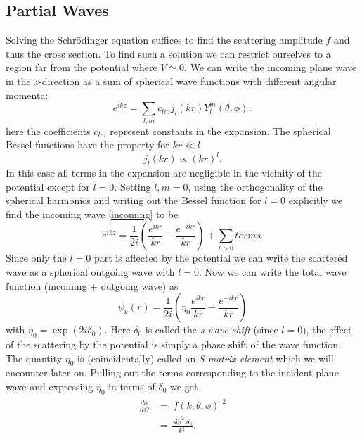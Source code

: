 \documentclass[11pt]{article}
\numberwithin{equation}{section}
\begin{document}
\subsection{Partial Waves}
Solving the Schr\"odinger equation suffices to find the scattering amplitude $f$ and thus the cross section. To find such a solution we can restrict ourselves to a region far from the potential where $V \simeq 0$. We can write the incoming plane wave in the $z$-direction as a sum of spherical wave functions with different angular momenta:
\begin{equation}\label{incoming}
e^{ikz} = \underset{l,m} \sum  c_{lm} j_{l}(kr)Y^m_l(\theta, \phi),
\end{equation}
here the coefficients $c_{lm}$ represent constants in the expansion. The spherical Bessel functions have the property for $kr \ll l$
\begin{equation}
	j_l(kr) \propto (kr)^l.
\end{equation}
In this case all terms in the expansion are negligible in the vicinity of the potential except for $l = 0$. Setting $l, m = 0$, using the orthogonality of the spherical harmonics and writing out the Bessel function for $l = 0$ explicitly we find the incoming wave \eqref{incoming} to be
\begin{equation}
e^{ikz} = \frac{1}{2i}\left( \frac{e^{ikr}}{kr} - \frac{e^{-ikr}}{kr} \right)	+ \underset{l > 0} \sum terms.
\end{equation}
Since only the $l = 0$ part is affected by the potential we can write the scattered wave as a spherical outgoing wave with $l = 0$. Now we can write the total wave function (incoming + outgoing wave) as
\begin{equation}
	\psi_k(r) = \frac{1}{2i}\left(\eta_0 \frac{e^{ikr}}{kr} - \frac{e^{-ikr}}{kr} \right)
\end{equation}
with $\eta_0 = \exp(2i\delta_0)$. Here $\delta_0$ is called the \emph{s-wave shift} (since $l=0$), the effect of the scattering by the potential is simply a phase shift of the wave function. The quantity $\eta_0$ is (coincidentally) called an \emph{S-matrix element} which we will encounter later on. Pulling out the terms corresponding to the incident plane wave and expressing $\eta_0$ in terms of $\delta_0$ we get
\begin{align}
\begin{split}
\frac{d\sigma}{d\Omega} &= |f(k,\theta, \phi)|^2	\\
&=\frac{\sin^2\delta_0}{k^2}.
\end{split}
\end{align}
\end{document}

